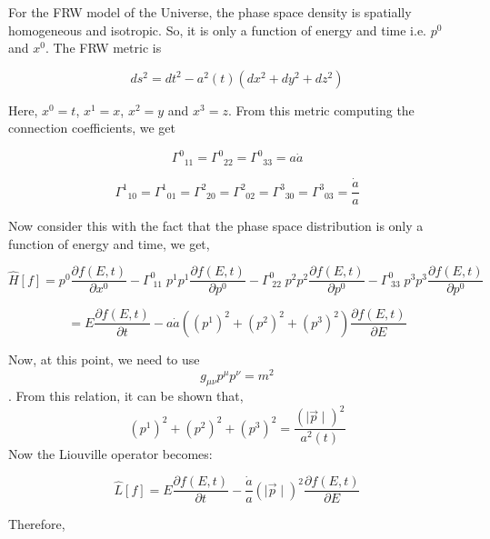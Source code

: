 \documentclass[12pt]{report}
\begin{document}
For the FRW model of the Universe, the phase space density is spatially homogeneous and isotropic. So, it is only a function of energy and time i.e. $p^0$ and   $x^0$. The FRW metric is 

$$ds^2=dt^2-a^2(t)(dx^2+dy^2+dz^2) $$ \cite{gwald}

Here, $x^0=t$, $x^1=x$, $x^2=y$ and $x^3=z$. From this metric computing the connection coefficients, we get \cite{gwald}

$$\Gamma^0_{\;\;11}=\Gamma^0_{\;\;22}=\Gamma^0_{\;\;33}=a
\dot{a}$$

$$\Gamma^1_{\;\;10}=\Gamma^1_{\;\;01}=\Gamma^2_{\;\;20}=\Gamma^2_{\;\;02}=\Gamma^3_{\;\;30}=\Gamma^3_{\;\;03}=\frac{\dot{a}}{a}$$

Now consider this with the fact that the phase space distribution is only a function of energy and time, we get,


$$\hat{H}[f]=p^0 \frac{\partial f(E,t)}{\partial x^0}-\Gamma^0_{\;11} \;p^1 p^1 \frac{\partial f(E,t)}{\partial p^0}-\Gamma^0_{\;22} \;p^2 p^2 \frac{\partial f(E,t)}{\partial p^0}-\Gamma^0_{\;33} \;p^3 p^3 \frac{\partial f(E,t)}{\partial p^0}$$

$$=E \frac{\partial f(E,t)}{\partial t}- a\dot{a}\left((p^1)^2+(p^2)^2+(p^3)^2\right) \frac{\partial f(E,t)}{\partial E} $$

Now, at this point, we need to use $$g_{\mu \nu}p^\mu p^\nu= m^2$$.
From this relation, it can be shown that,
$$(p^1)^2+(p^2)^2+(p^3)^2= \frac{(\mid\vec{p}\mid)^2}{a^2(t)}$$ 
Now the Liouville operator becomes:


$$\hat{L}[f]=E\frac{\partial f(E,t)}{\partial t}- \frac{\dot{a}}{a} \left(\mid \vec{p}\mid \right)^2 \frac{\partial f(E,t)}{\partial E}$$

Therefore,
\end{document}
